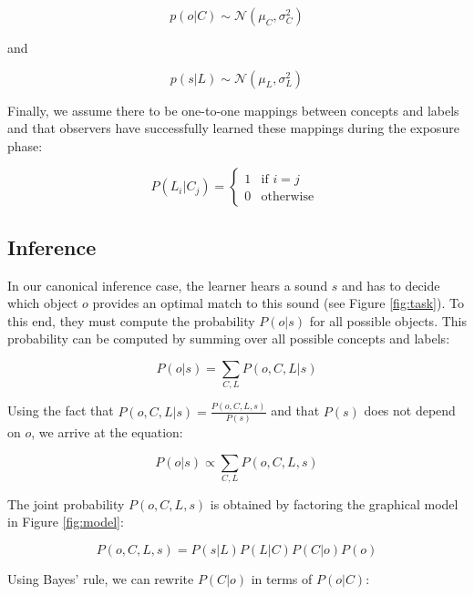 \documentclass[english,,man]{apa6}
\theoremstyle{definition}
\theoremstyle{definition}
\theoremstyle{definition}
\theoremstyle{remark}
\begin{document}
\begin{equation} \label{eq:object}
 p(o | C) \sim  \mathcal{N}(\mu_C, \sigma^2_C) 
\end{equation}

\begin{center}
and 
\end{center}

\begin{equation} \label{eq:sound}
p(s| L) \sim  \mathcal{N}(\mu_L, \sigma^2_L)
\end{equation}

Finally, we assume there to be one-to-one mappings between concepts and
labels and that observers have successfully learned these mappings
during the exposure phase:

\begin{equation}
P(L_i|C_j) = 
\begin{cases}
  1 & \text{if  }  i=j \\  
  0  & \text{otherwise  }
\end{cases}
\end{equation}

\subsection{Inference}\label{inference}

In our canonical inference case, the learner hears a sound \(s\) and has
to decide which object \(o\) provides an optimal match to this sound
(see Figure \ref{fig:task}). To this end, they must compute the
probability \(P(o|s)\) for all possible objects. This probability can be
computed by summing over all possible concepts and labels:

\begin{equation}
P(o|s)=\sum_{C,L} P(o, C, L| s)  
\end{equation}

Using the fact that \(P(o,C,L|s) = \frac{P(o,C,L,s)}{P(s)}\) and that
\(P(s)\) does not depend on \(o\), we arrive at the equation:

\begin{equation}
P(o|s) \propto \sum_{C,L} P(o, C, L, s) 
\end{equation}

The joint probability \(P(o,C,L,s)\) is obtained by factoring the
graphical model in Figure \ref{fig:model}:

\[P(o,C,L,s) = P(s|L)P(L|C)P(C|o)P(o)\]

Using Bayes' rule, we can rewrite \(P(C|o)\) in terms of \(P(o|C)\):
\end{document}
